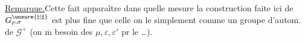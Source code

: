 \uline{Remarque.}\quad Cette  fait apparaître
dans quelle mesure la construction faite ici de
$G_{\rho,\sigma}^{\unsure{\natural|\sharp}}$
est plus fine que celle 
on le  simplement comme un
groupe d'autom. de $\mathcal G^+$
(on $\overline{\mathrm m}$  besoin
des $\mu,\varepsilon,\varepsilon'$
pr  le \ldots).
